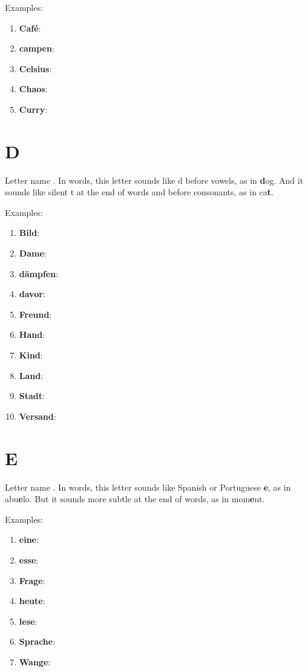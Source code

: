 Examples:
\begin{enumerate}
    \item \textbf{Café}: \textipa{[ka"fe:]}
    \item \textbf{campen}: \textipa{["kEmp@n]}
    \item \textbf{Celsius}: \textipa{["tselziUs]}
    \item \textbf{Chaos}: \textipa{["ka:os]}
    \item \textbf{Curry}: \textipa{["k{\oe}ri]}
\end{enumerate}

\section*{D}

Letter name \textipa{[de:]}. In words, this letter sounds like d before vowels, as in \textbf{d}og. And it sounds like silent t at the end of words and before consonants, as in ca\textbf{t}.

Examples:
\begin{enumerate}
    \item \textbf{Bild}: \textipa{[bIlt]}
    \item \textbf{Dame}: \textipa{["da:m@]}
    \item \textbf{dämpfen}: \textipa{["dEmpf@n]}
    \item \textbf{davor}: \textipa{["da:fOr,da"fo:r]}
    \item \textbf{Freund}: \textipa{[frOYnt]}
    \item \textbf{Hand}: \textipa{[hant]}
    \item \textbf{Kind}: \textipa{[kint]}
    \item \textbf{Land}: \textipa{[lant]}
    \item \textbf{Stadt}: \textipa{[Stat]}
    \item \textbf{Versand}: 
\end{enumerate}

\section*{E}

Letter name \textipa{[e:]}. In words, this letter sounds like Spanish or Portuguese \textbf{e}, as in abu\textbf{e}lo. But it sounds more subtle at the end of words, as in mom\textbf{e}nt.

Examples:
\begin{enumerate}
    \item \textbf{eine}: \textipa{["aIn@]}
    \item \textbf{esse}: \textipa{["Es@]}
    \item \textbf{Frage}: \textipa{["fra:g@]}
    \item \textbf{heute}: \textipa{["hOYt@]}
    \item \textbf{lese}: \textipa{["le:s@]}
    \item \textbf{Sprache}: \textipa{["Spra:x@]}
    \item \textbf{Wange}: \textipa{["vang@]}
\end{enumerate}

